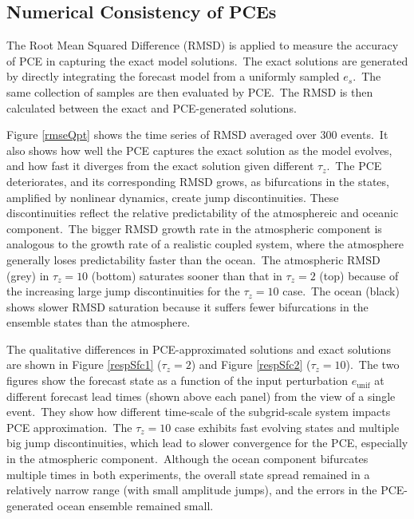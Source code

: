 			
		\subsection {Numerical Consistency of PCEs} \label{subsec:num_cons}	
			The Root Mean Squared Difference (RMSD) is applied to measure
			the accuracy of PCE in capturing the exact model solutions.\
			The exact solutions are generated by directly integrating the 
			forecast model from a uniformly sampled $e_s$.\ 
			The same collection of samples are then evaluated by PCE.\
			The RMSD is then calculated between the exact and PCE-generated solutions.\


			Figure {\ref{rmseQpt}} shows the time series of RMSD averaged over 300 events.\ 
			It also shows how well the PCE captures 
			the exact solution as the model evolves, and how fast
			it diverges from the exact solution given different $\tau_z$.\
			The PCE deteriorates, and its corresponding RMSD grows, as bifurcations in the
                        states, amplified by nonlinear dynamics, create 
			jump discontinuities.
			These discontinuities reflect the relative predictability of the atmosphereic and oceanic component.\
			The bigger RMSD growth rate in the atmospheric component 
			is analogous to the growth rate of a realistic coupled system, where
			the atmosphere generally loses predictability faster than the ocean.\
			The atmospheric RMSD (grey) in $\tau_z=10$ (bottom) 
			saturates sooner than that in $\tau_z=2$ (top) because of 
                        the increasing
			large jump discontinuities for the $\tau_z=10$ case.\
			The ocean (black) shows slower RMSD saturation because it suffers
			fewer bifurcations in the ensemble states than the atmosphere.



			The qualitative differences in PCE-approximated solutions and exact solutions
			are shown in Figure {\ref{respSfc1}} ($\tau_z=2$) and Figure {\ref{respSfc2}} ($\tau_z=10$).\
			The two figures show the forecast state as a function of the 
			input perturbation $e_{\text{unif}}$ at different forecast lead times (shown above each panel)
			from the view of a single event.\
			They show how different time-scale
			of the subgrid-scale system impacts PCE approximation.\ 
			The $\tau_z=10$ case exhibits fast evolving states and multiple
			big jump discontinuities, which lead to slower convergence for the PCE,
			especially in the atmospheric component.\
			Although the ocean component 
			bifurcates multiple times in both experiments,
			the overall state spread remained in a relatively 
			narrow range (with small amplitude jumps), and
			the errors in the PCE-generated ocean ensemble remained
			small.\


